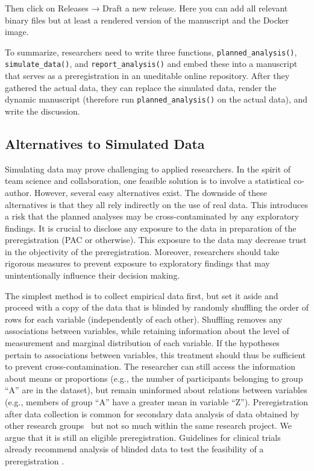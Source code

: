 \documentclass[psych,tutorial,accept,moreauthors,pdftex]{Definitions/mdpi}
\begin{document}
\begin{paracol}{2}
Then click on Releases → Draft a new release. Here you can add all
relevant binary files but at least a rendered version of the manuscript
and the Docker image.

To summarize, researchers need to write three functions,
\texttt{planned\_analysis()}, \texttt{simulate\_data()}, and
\texttt{report\_analysis()} and embed these into a manuscript that
serves as a preregistration in an uneditable online repository. After
they gathered the actual data, they can replace the simulated data,
render the dynamic manuscript (therefore run
\texttt{planned\_analysis()} on the actual data), and write the
discussion.

\subsection{Alternatives to Simulated
Data}\label{alternatives-to-simulated-data}

Simulating data may prove challenging to applied researchers. In the
spirit of team science and collaboration, one feasible solution is to
involve a statistical co-author. However, several easy alternatives
exist. The downside of these alternatives is that they all rely
indirectly on the use of real data. This introduces a risk that the
planned analyses may be cross-contaminated by any exploratory findings.
It is crucial to disclose any exposure to the data in preparation of the
preregistration (PAC or otherwise). This exposure to the data may
decrease trust in the objectivity of the preregistration. Moreover,
researchers should take rigorous measures to prevent exposure to
exploratory findings that may unintentionally influence their decision
making.

The simplest method is to collect empirical data first, but set it aside
and proceed with a copy of the data that is blinded by randomly
shuffling the order of rows for each variable (independently of each
other). Shuffling removes any associations between variables, while
retaining information about the level of measurement and marginal
distribution of each variable. If the hypotheses pertain to associations
between variables, this treatment should thus be sufficient to prevent
cross-contamination. The researcher can still access the information
about means or proportions (e.g., the number of participants belonging
to group ``A'' are in the dataset), but remain uninformed about
relations between variables (e.g., members of group ``A'' have a greater
mean in variable ``Z''). Preregistration after data collection is common
for secondary data analysis of data obtained by other research groups~\citep{westonRecommendationsIncreasingTransparency2019} but not so much
within the same research project. We argue that it is still an eligible
preregistration. Guidelines for clinical trials already recommend
analysis of blinded data to test the feasibility of a preregistration
\citep{ICH1998}.


\end{paracol}
\end{document}
